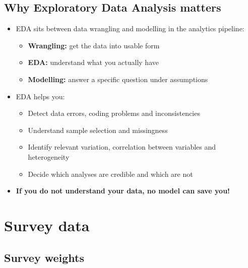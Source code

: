 \documentclass[
  letterpaper,
  DIV=11,
  numbers=noendperiod]{scrartcl}
\providecommand{\tightlist}{%
  \setlength{\itemsep}{0pt}\setlength{\parskip}{0pt}}
\begin{document}
\subsection{Why Exploratory Data Analysis
matters}\label{why-exploratory-data-analysis-matters}

\begin{itemize}
\tightlist
\item
  EDA sits between data wrangling and modelling in the analytics
  pipeline:

  \begin{itemize}
  \tightlist
  \item
    \textbf{Wrangling:} get the data into usable form
  \item
    \textbf{EDA:} understand what you actually have
  \item
    \textbf{Modelling:} answer a specific question under assumptions
  \end{itemize}
\item
  EDA helps you:

  \begin{itemize}
  \tightlist
  \item
    Detect data errors, coding problems and inconsistencies
  \item
    Understand sample selection and missingness
  \item
    Identify relevant variation, correlation between variables and
    heterogeneity
  \item
    Decide which analyses are credible and which are not
  \end{itemize}
\item
  \textbf{If you do not understand your data, no model can save you!}
\end{itemize}

\section{Survey data}\label{survey-data}

\subsection{Survey weights}\label{survey-weights}
\end{document}
